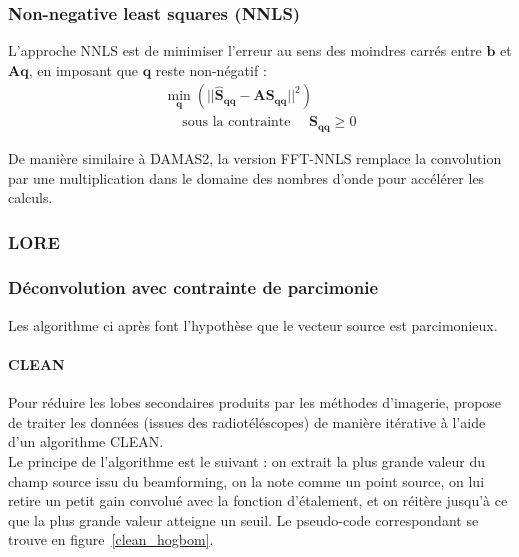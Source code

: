 \subsubsection{Non-negative least squares (NNLS)}
L'approche NNLS est de minimiser l'erreur au sens des moindres carrés entre $\bm{b}$ et $\bm{Aq}$, en imposant que $\bm{q}$ reste non-négatif : 
\begin{eqnarray}
\min_{\bm{q}}\left(||\bm{\hat{S}_{qq}}-\bm{A}\bm{S_{qq}}||^2 \right)\\
\text{~~~~sous la contrainte~~~~}\bm{S_{qq}}\geq 0
\end{eqnarray}

De manière similaire à DAMAS2, la version FFT-NNLS remplace la convolution par une multiplication dans le domaine des nombres d'onde pour accélérer les calculs.

\subsubsection{LORE}


\subsubsection{Déconvolution avec contrainte de parcimonie}
Les algorithme ci après font l'hypothèse que le vecteur source est parcimonieux. 

\paragraph{CLEAN}
Pour réduire les lobes secondaires produits par les méthodes d'imagerie, \citep{Hogbom1974} propose de traiter les données (issues des radiotéléscopes) de manière itérative à l'aide d'un algorithme CLEAN.\\
Le principe de l'algorithme est le suivant : on extrait la plus grande valeur du champ source issu du beamforming, on la note comme un point source, on lui retire un petit gain convolué avec la fonction d'étalement, et on réitère jusqu'à ce que la plus grande valeur atteigne un seuil. Le pseudo-code correspondant se trouve en figure~\ref{clean_hogbom}.\\


